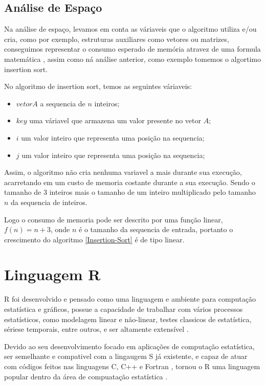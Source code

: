 \documentclass[
	12pt,				%
	openright,			%
	oneside,			%
	a4paper,			%
	english,			%
	brazil				%
	]{abntex2}
\begin{document}
\subsection{Análise de Espaço}

Na análise de espaço, levamos em conta as váriaveis que o algoritmo utiliza e/ou cria, como por exemplo, estruturas
auxiliares como vetores ou matrizes, conseguimos representar o consumo esperado de memória atravez de uma formula
matemática \cite{introductionAnalysis}, assim como ná análise anterior, como exemplo tomemos o algortimo insertion sort.

No algoritmo de insertion sort, temos as seguintes váriaveis:

\begin{itemize}
	\item $vetor A$ a sequencia de $n$ inteiros;
	\item $key$ uma váriavel que armazena um valor presente no vetor $A$;
	\item $i$ um valor inteiro que representa uma posição na sequencia;
	\item $j$ um valor inteiro que representa uma posição na sequencia;
\end{itemize}

Assim, o algoritmo não cria nenhuma variavel a mais durante sua execução, acarretando em um custo de memoria costante durante
a sua execução. Sendo o tamanho de 3 inteiros mais o tamanho de um inteiro multiplicado pelo tamanho $n$ da sequencia de
inteiros.

Logo o consumo de memoria pode ser descrito por uma função linear, $f(n) = n + 3$, onde $n$ é o tamanho da sequencia de
entrada, portanto o crescimento do algoritmo \ref{Insertion-Sort} é de tipo linear.

\section{Linguagem R}

R foi desenvolvido e pensado como uma linguagem e ambiente para computação estatística e gráficos, possue a capacidade
de trabalhar com vários processos estatísticos, como modelagem linear e não-linear, testes classicos de estatística,
sériese temporais, entre outros, e ser altamente extensível \cite{ling_r}.

Devido ao seu desenvolvimento focado em aplicações de computação estatística, ser semelhante e compativel 
com a lingaugem S já existente, e capaz de atuar com códigos feitos nas linguagens C, C++ e Fortran \cite{ling_r},
tornou o R uma linguagem popular dentro da área de compuatação estatística \cite{linguagem_r}.
\end{document}

